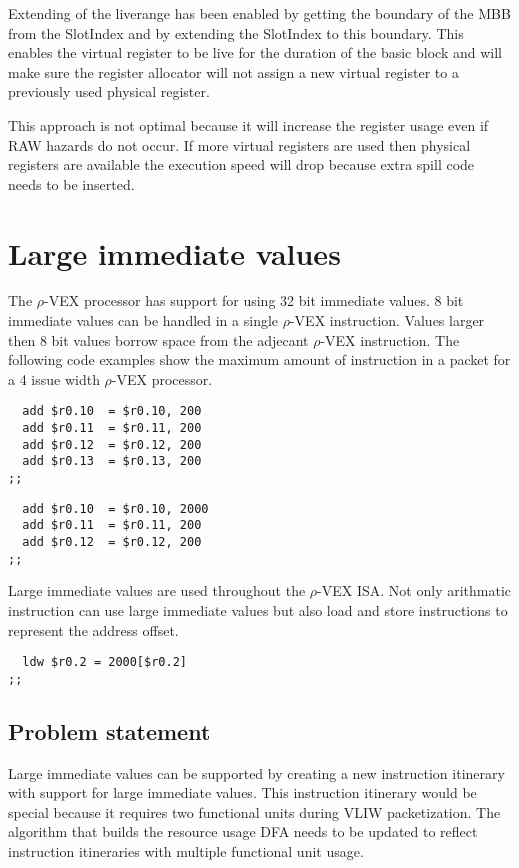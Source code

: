 Extending of the liverange has been enabled by getting the boundary of the MBB from the SlotIndex and by extending the SlotIndex to this boundary. This enables the virtual register to be live for the duration of the basic block and will make sure the register allocator will not assign a new virtual register to a previously used physical register.

This approach is not optimal because it will increase the register usage even if RAW hazards do not occur. If more virtual registers are used then physical registers are available the execution speed will drop because extra spill code needs to be inserted.

\section{Large immediate values}
The $\rho$-VEX processor has support for using 32 bit immediate values. 8 bit immediate values can be handled in a single $\rho$-VEX instruction. Values larger then 8 bit values borrow space from the adjecant $\rho$-VEX instruction. The following code examples show the maximum amount of instruction in a packet for a 4 issue width $\rho$-VEX processor.

\begin{lstlisting}
  add $r0.10  = $r0.10, 200
  add $r0.11  = $r0.11, 200
  add $r0.12  = $r0.12, 200
  add $r0.13  = $r0.13, 200
;;
\end{lstlisting}

\begin{lstlisting}
  add $r0.10  = $r0.10, 2000
  add $r0.11  = $r0.11, 200
  add $r0.12  = $r0.12, 200
;;
\end{lstlisting}

Large immediate values are used throughout the $\rho$-VEX ISA. Not only arithmatic instruction can use large immediate values but also load and store instructions to represent the address offset.

\begin{lstlisting}
  ldw $r0.2 = 2000[$r0.2]
;;
\end{lstlisting}

\subsection{Problem statement} %
\label{sub:problem_statement}
Large immediate values can be supported by creating a new instruction itinerary with support for large immediate values. This instruction itinerary would be special because it requires two functional units during VLIW packetization. The algorithm that builds the resource usage DFA needs to be updated to reflect instruction itineraries with multiple functional unit usage.

